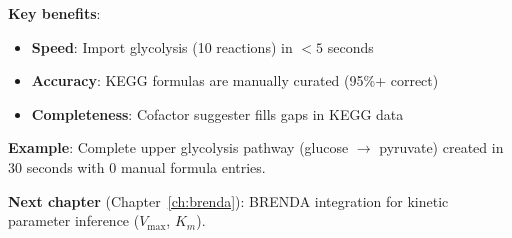 \textbf{Key benefits}:

\begin{itemize}
    \item \textbf{Speed}: Import glycolysis (10 reactions) in $<5$ seconds
    \item \textbf{Accuracy}: KEGG formulas are manually curated (95\%+ correct)
    \item \textbf{Completeness}: Cofactor suggester fills gaps in KEGG data
\end{itemize}

\textbf{Example}: Complete upper glycolysis pathway (glucose $\to$ pyruvate) created in 30 seconds with 0 manual formula entries.

\textbf{Next chapter} (Chapter~\ref{ch:brenda}): BRENDA integration for kinetic parameter inference ($V_{\max}$, $K_m$).
